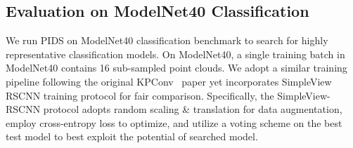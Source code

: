 \documentclass[10pt,twocolumn,letterpaper]{article}
\begin{document}
\subsection{Evaluation on ModelNet40 Classification}
We run PIDS on ModelNet40 classification benchmark to search for highly representative classification models.
On ModelNet40, a single training batch in ModelNet40 contains 16 sub-sampled point clouds.
We adopt a similar training pipeline following the original KPConv~\cite{thomas2019kpconv} paper yet incorporates SimpleView~\cite{goyal2021revisiting} RSCNN training protocol for fair comparison.
Specifically, the SimpleView-RSCNN protocol adopts random scaling \& translation for data augmentation, employ cross-entropy loss to optimize, and utilize a voting scheme on the best test model to best exploit the potential of searched model.
\begin{table}[h]
    \begin{center}
    \caption{Overall Accuracy (OA) on ModelNet40. : Use native protocol instead of SimpleView RSCNN evaluation protocol.}
    \label{tab:result_modelnet40}
    \end{center}
    \vspace{-2em}
\end{table}
\end{document}
